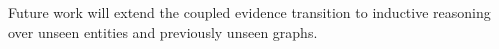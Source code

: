 \documentclass[a4paper,fleqn]{cas-sc}
\begin{document}

Future work will extend the coupled evidence transition to inductive reasoning
over unseen entities and previously unseen graphs.

\printcredits

%





\end{document}
